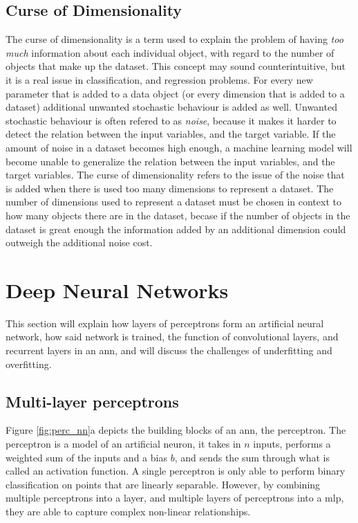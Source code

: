 \subsection{Curse of Dimensionality}
The curse of dimensionality is a term used to explain the problem of having \textit{too much} information about each individual object, with regard to the number of objects that make up the dataset. This concept may sound counterintuitive, but it is a real issue in classification, and regression problems. For every new parameter that is added to a data object (or every dimension that is added to a dataset) additional unwanted stochastic behaviour is added as well. Unwanted stochastic behaviour is often refered to as \textit{noise}, because it makes it harder to detect the relation between the input variables, and the target variable. If the amount of noise in a dataset becomes high enough, a machine learning model will become unable to generalize the relation between the input variables, and the target variables. The curse of dimensionality refers to the issue of the noise that is added when there is used too many dimensions to represent a dataset. The number of dimensions used to represent a dataset must be chosen in context to how many objects there are in the dataset, becase if the number of objects in the dataset is great enough the information added by an additional dimension could outweigh the additional noise cost.

\clearpage

\section{Deep Neural Networks} \label{sec:ann}

This section will explain how layers of perceptrons form an artificial neural network, how said network is trained, the function of convolutional layers, and recurrent layers in an \acrshort{ann}, and will discuss the challenges of underfitting and overfitting.

\subsection{Multi-layer perceptrons} \label{sec:mlp}
Figure \ref{fig:perc_nn}a depicts the building blocks of an \acrshort{ann}, the perceptron. 
The perceptron is a model of an artificial neuron, it takes in $n$ inputs, performs a weighted sum of the inputs and a bias $b$, and sends the sum through what is called an activation function. A single perceptron is only able to perform binary classification on points that are linearly separable. However, by combining multiple perceptrons into a layer, and multiple layers of perceptrons into a \acrfull{mlp}, they are able to capture complex non-linear relationships. 

